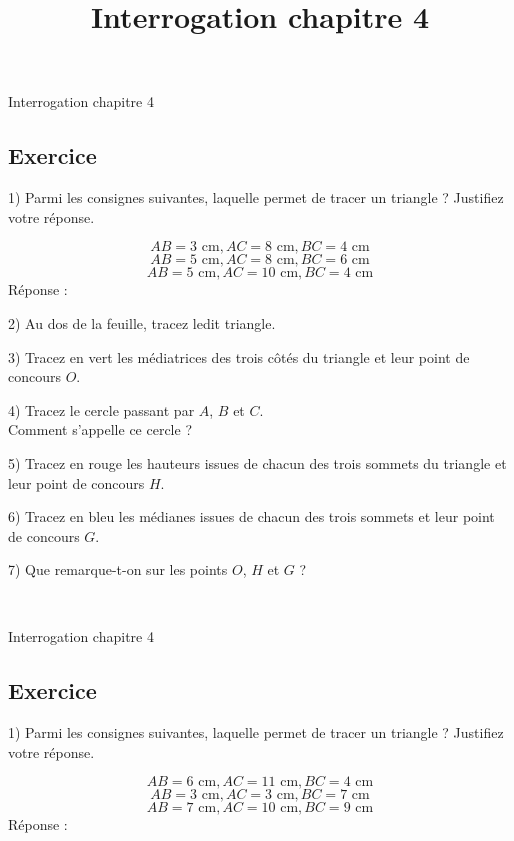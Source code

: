 \documentclass[14pt]{extreport}
\title{Interrogation chapitre 4}
\date{}
\theoremstyle{plain}
\begin{document}
\begin{center}{\Large Interrogation chapitre 4}\end{center}

\subsection*{Exercice}

1) Parmi les consignes suivantes, laquelle permet de tracer un triangle ? Justifiez votre réponse. 

\[ AB = 3\text{ cm}, AC=8\text{ cm},BC = 4\text{ cm}\]
\[ AB = 5\text{ cm}, AC=8\text{ cm},BC = 6\text{ cm}\]
\[ AB = 5\text{ cm}, AC=10\text{ cm},BC = 4\text{ cm}\]
Réponse : \dotfill

\dotfill

\dotfill

2) Au dos de la feuille, tracez ledit triangle. 

3) Tracez en vert les médiatrices des trois côtés du triangle et leur point de concours $O$. 

4) Tracez le cercle passant par $A$, $B$ et $C$. \\Comment s'appelle ce cercle ? \dotfill 

5) Tracez en rouge les hauteurs issues de chacun des trois sommets du triangle et leur point de concours $H$. 

6) Tracez en bleu les médianes issues de chacun des trois sommets et leur point de concours $G$. 

7) Que remarque-t-on sur les points $O$, $H$ et $G$ ? \dotfill 

 \  \dotfill
 
 \newpage 
 

\begin{center}{\Large Interrogation chapitre 4}\end{center}

 
 
\subsection*{Exercice}

1) Parmi les consignes suivantes, laquelle permet de tracer un triangle ? Justifiez votre réponse. 

\[ AB = 6\text{ cm}, AC= 11\text{ cm},BC = 4\text{ cm}\]
\[ AB = 3\text{ cm}, AC=3 \text{ cm},BC = 7\text{ cm}\]
\[ AB = 7\text{ cm}, AC=10\text{ cm},BC = 9\text{ cm}\]
Réponse : \dotfill

\dotfill
\end{document}
